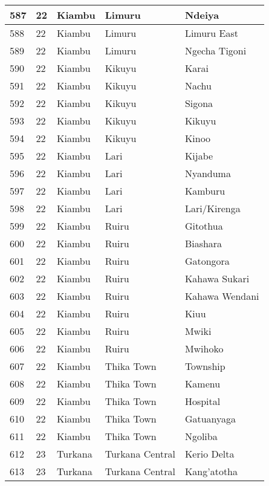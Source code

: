 \begin{table}[!ht]
\begin{tabular}{|l|l|l|l|l|}
        587 & 22 & Kiambu & Limuru & Ndeiya \\ \hline
        588 & 22 & Kiambu & Limuru & Limuru East \\ \hline
        589 & 22 & Kiambu & Limuru & Ngecha Tigoni \\ \hline
        590 & 22 & Kiambu & Kikuyu & Karai \\ \hline
        591 & 22 & Kiambu & Kikuyu & Nachu \\ \hline
        592 & 22 & Kiambu & Kikuyu & Sigona \\ \hline
        593 & 22 & Kiambu & Kikuyu & Kikuyu \\ \hline
        594 & 22 & Kiambu & Kikuyu & Kinoo \\ \hline
        595 & 22 & Kiambu & Lari & Kijabe \\ \hline
        596 & 22 & Kiambu & Lari & Nyanduma \\ \hline
        597 & 22 & Kiambu & Lari & Kamburu \\ \hline
        598 & 22 & Kiambu & Lari & Lari/Kirenga \\ \hline
        599 & 22 & Kiambu & Ruiru & Gitothua \\ \hline
        600 & 22 & Kiambu & Ruiru & Biashara \\ \hline
        601 & 22 & Kiambu & Ruiru & Gatongora \\ \hline
        602 & 22 & Kiambu & Ruiru & Kahawa Sukari \\ \hline
        603 & 22 & Kiambu & Ruiru & Kahawa Wendani \\ \hline
        604 & 22 & Kiambu & Ruiru & Kiuu \\ \hline
        605 & 22 & Kiambu & Ruiru & Mwiki \\ \hline
        606 & 22 & Kiambu & Ruiru & Mwihoko \\ \hline
        607 & 22 & Kiambu & Thika Town & Township \\ \hline
        608 & 22 & Kiambu & Thika Town & Kamenu \\ \hline
        609 & 22 & Kiambu & Thika Town & Hospital \\ \hline
        610 & 22 & Kiambu & Thika Town & Gatuanyaga \\ \hline
        611 & 22 & Kiambu & Thika Town & Ngoliba \\ \hline
        612 & 23 & Turkana & Turkana Central & Kerio Delta \\ \hline
        613 & 23 & Turkana & Turkana Central & Kang’atotha \\ \hline

\end{tabular}
\end{table}
